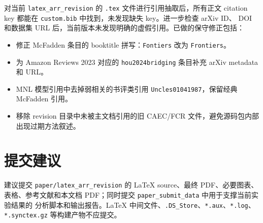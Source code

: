 \documentclass[11pt,fontset=none]{ctexart}
\begin{document}
对当前 \texttt{latex\_arr\_revision} 的 \texttt{.tex} 文件进行引用抽取后，所有正文
citation key 都能在 \texttt{custom.bib} 中找到，未发现缺失 key。进一步检查 arXiv ID、
DOI 和数据集 URL 后，当前版本未发现明确的虚假引用。已做的保守修正包括：

\begin{itemize}
  \item 修正 McFadden 条目的 booktitle 拼写：\texttt{Fontiers} 改为 \texttt{Frontiers}。
  \item 为 Amazon Reviews 2023 对应的 \texttt{hou2024bridging} 条目补充 arXiv metadata 和 URL。
  \item MNL 模型引用中去掉弱相关的书评类引用 \texttt{Uncles01041987}，保留经典 McFadden 引用。
  \item 移除 revision 目录中未被主文档引用的旧 CAEC/FCR 文件，避免源码包内部出现过期方法叙述。
\end{itemize}

\section{提交建议}

建议提交 \texttt{paper/latex\_arr\_revision} 的 LaTeX source、最终 PDF、必要图表、
表格、参考文献和本文档 PDF；同时提交 \texttt{paper\_submit\_data} 中用于支撑当前实验结果的
分析脚本和输出报告。LaTeX 中间文件、\texttt{.DS\_Store}、\texttt{*.aux}、\texttt{*.log}、
\texttt{*.synctex.gz} 等构建产物不应提交。
\end{document}
